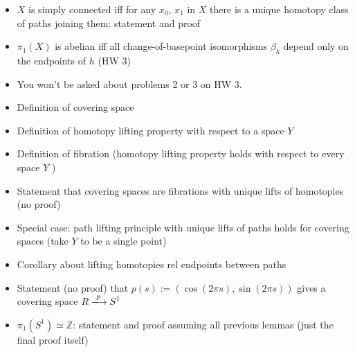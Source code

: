 \documentclass[12pt]{article}
\newcommand{\mz}{\mathbb{Z}}
\begin{document}
\begin{itemize}
\vspace*{30mm}
\item $X$ is simply connected iff for any $x_0$, $x_1$ in $X$ there is a unique homotopy class of
paths joining them: statement and proof


\vspace*{30mm}
\item $\pi_1(X)$ is abelian iff all change-of-basepoint isomorphisms $\beta_h$ depend only on the
endpoints of $h$ (HW 3)


\vspace*{30mm}
\item You won't be asked about problems 2 or 3 on HW 3.


\vspace*{30mm}
\end{itemize}
\begin{itemize}
\section{The Fundamental Group of the Circle}
\item Definition of covering space


\vspace*{30mm}
\item Definition of homotopy lifting property with respect to a space $Y$


\vspace*{30mm}
\item Definition of fibration (homotopy lifting property holds with respect to every space
$Y$ )


\vspace*{30mm}
\item Statement that covering spaces are fibrations with unique lifts of homotopies (no
proof)


\vspace*{30mm}
\item Special case: path lifting principle with unique lifts of paths holds for covering spaces
(take $Y$ to be a single point)


\vspace*{30mm}
\item Corollary about lifting homotopies rel endpoints between paths


\vspace*{30mm}
\item Statement (no proof) that $p(s) := (\cos(2\pi s), \sin(2\pi s))$ gives a covering space $R\xlongrightarrow{p} S^1$


\vspace*{30mm}
\item $\pi_1(S^1)\simeq \mz$: statement and proof assuming all previous lemmas (just the final proof
itself)
\end{itemize}
\end{document}

